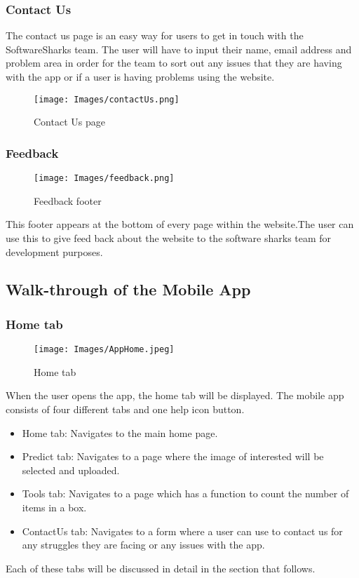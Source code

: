 \documentclass[a4paper, 12pt]{article}
\begin{document}
\subsubsection{Contact Us}

The contact us page is an easy way for users to get in touch with the SoftwareSharks team. The user will have to input their name, email address and problem area in order for the team to sort out any issues that they are having with the app or if a user is having problems using the website.
\begin{figure}[!ht]
\texttt{[image: Images/contactUs.png]}
\centering
\caption{Contact Us page} 
\end{figure}

\subsubsection{Feedback}
\begin{figure}[!ht]
\texttt{[image: Images/feedback.png]}
\centering
\caption{Feedback footer} 
\end{figure}
This footer appears at the bottom of every page within the website.The user can use this to give feed back about the website to the software sharks team for development purposes.

\subsection{Walk-through of the Mobile App}
\subsubsection{Home tab}
\begin{figure}[h!]
\texttt{[image: Images/AppHome.jpeg]}
\centering
\caption{Home tab}
\end{figure}
When the  user opens the app, the home tab will be displayed.
The mobile app consists of four different tabs and one help icon button.
\begin{itemize}
\item Home tab: Navigates to the main home page.
\item Predict tab: Navigates to a page where the image of interested  will be selected and uploaded.
\item Tools tab: Navigates to a page which has a function to count the number of items in a box.
\item ContactUs tab: Navigates to a form where a user can use to contact us for any struggles they are facing or any issues with the app.
\end{itemize}
Each of these tabs will be discussed in detail in the  section that follows.
\pagebreak
\newpage
\end{document}
